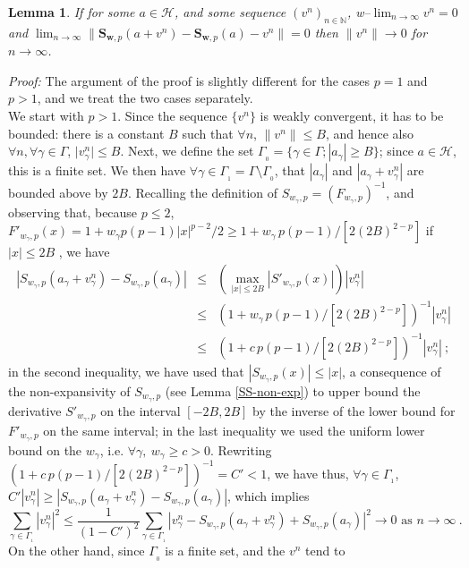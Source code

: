 \documentclass[10pt]{article}
\newtheorem{lemma}[theorem]{Lemma}
\def\N{\mathbb{N}}
\def\S{\mathbf{S}}
\def\cH{\mathcal{H}}
\def\ag{w_{\gamma}}
\def\g{\gamma}
\begin{document}
\begin{lemma}
\label{lm-3-16}
If for some $a \in \cH$, and some sequence $(v^n)_{n \in \N}$,
w--$\lim_{n \to \infty}v^n=0$  and
$\lim_{n \to \infty}\| { \S}_{\mathbf{w},p}(a+v^n) -
{\S}_{\mathbf{w},p}(a) - v^n \|=0$
then $\| v^n \| \to 0$ for $n \to \infty$.
\end{lemma}
{\em Proof:}
The argument of the proof is slightly different for the cases $p=1$
and $p>1$, and we treat the two cases separately. \\
We start with $p>1$.
Since the sequence $\{v^n\}$ is weakly convergent, it has to be bounded: there
is a constant $B$ such that $\forall n$, $\| v^n \| \leq B$, and
hence also $\forall n, \forall \g \in \Gamma$, $\vert v^n_\g \vert \leq B$.
Next, we define the set $\Gamma_{_{\!0}}
= \{ \g \in \Gamma; |a_{\g}| \geq B\}$; since $a \in \cH$, this is a finite
set. We then have $\forall \g \in \Gamma_{_{\!1}}=\Gamma \setminus
\Gamma_{_{\!0}}$,
that $|a_{\g}|$ and $|a_{\g}+v^n_{\g}|$ are bounded above by $2B$.
Recalling the definition of $S_{\ag,p}=\left(F_{\ag,p}\right)^{-1}$,
and observing that, because $p \leq 2$,
$F'_{\ag,p}(x)=1+\ag p(p-1)|x|^{p-2}/2 \geq
1+ \ag \, p(p-1) /[2(2B)^{2-p}]$ if $|x| \leq 2B$ , we have
\begin{eqnarray*}
|S_{\ag,p}(a_{\g}+v^n_{\g}) - S_{\ag,p}(a_{\g})|
&\leq &\left( {\mathop {\max}_{|x|\leq 2B}} |S'_{\ag,p}(x)| \right) |v^n_{\g}|
\\ & \leq & \left( 1+ \ag\, p(p-1) /[2 (2B)^{2-p}] \right)^{-1} |v^n_{\g}| \\
& \leq & \left( 1+ c \, p(p-1) / [2(2B)^{2-p}] \right)^{-1} |v^n_{\g}|~;
\end{eqnarray*}
in the second inequality,
we have used that $|S_{\ag,p}(x)| \leq |x|$, a consequence of the
non-expansivity
 of $S_{\ag,p}$ (see
Lemma
\ref{SS-non-exp}) to upper bound the derivative
$S'_{\ag,p}$ on the interval $[-2B,2B]$ by the inverse of the lower bound for
$F'_{\ag ,p}$ on the same interval;
in the last inequality we used the uniform lower bound on the $\ag$, i.e.
$\forall \g,
~ \ag \geq c >0$.
Rewriting $\left( 1+ c \, p(p-1) / [2(2B)^{2-p}] \right)^{-1}= C'<1$, we
have thus,
$\forall \g \in \Gamma_{_{\!1}}$, $C'|v^n_{\g}| \geq
|S_{\ag,p}(a_{\g}+v^n_{\g}) - S_{\ag,p}(a_{\g})|$, which implies
$$
\sum_{\g \in \Gamma_{_{\!1}}} |v^n_{\g}|^2 \leq
\frac{1}{(1-C')^2} \sum_{\g \in \Gamma_{_{\!1}}} |v^n_{\g}
-S_{\ag,p}(a_{\g}+v^n_{\g})
+ S_{\ag,p}(a_{\g})|^2  \to 0 \mbox{ as } n \to \infty ~.
$$
On the other hand, since $\Gamma_{_{\!0}}$ is a finite set, and the $v^n$
tend to
\end{document}
